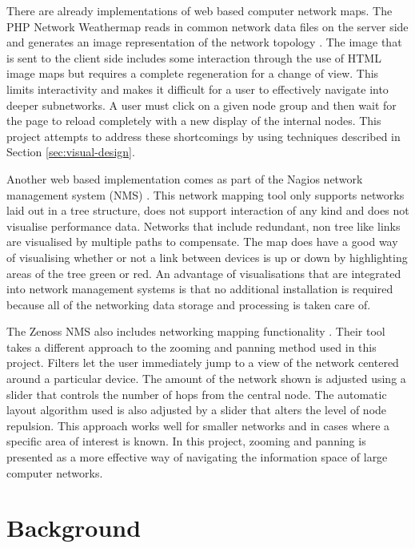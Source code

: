 \documentclass[11pt, a4paper]{article}
\begin{document}
There are already implementations of web based computer network maps. The PHP
Network Weathermap reads in common network data files on the server side and
generates an image representation of the network topology
\cite{PHP_Network_Weathermap_website}. The image that is sent to the client side
includes some interaction through the use of HTML image maps but requires a
complete regeneration for a change of view. This limits interactivity and makes
it difficult for a user to effectively navigate into deeper subnetworks. A user
must click on a given node group and then wait for the page to reload completely
with a new display of the internal nodes. This project attempts to address
these shortcomings by using techniques described in Section
\ref{sec:visual-design}. 

Another web based implementation comes as part of the Nagios network management
system (NMS) \cite{Nagios_website}. This network mapping tool only supports networks
laid out in a tree structure, does not support interaction of any kind and does
not visualise performance data. Networks that include redundant, non tree like
links are visualised by multiple paths to compensate. The map does have a good
way of visualising whether or not a link between devices is up or down by
highlighting areas of the tree green or red. An advantage of visualisations that
are integrated into network management systems is that no additional
installation is required because all of the networking data storage and
processing is taken care of.

The Zenoss NMS also includes networking mapping functionality
\cite{Zenoss_website}. Their tool takes a different approach to the zooming and
panning method used in this project. Filters let the user immediately jump to a
view of the network centered around a particular device. The amount of the
network shown is adjusted using a slider that controls the number of hops from
the central node. The automatic layout algorithm used is also adjusted by a
slider that alters the level of node repulsion. This approach works well for
smaller networks and in cases where a specific area of interest is known. In
this project, zooming and panning is presented as a more effective way of
navigating the information space of large computer networks.

\newpage

\section{Background}
\label{sec:background}
\end{document}
